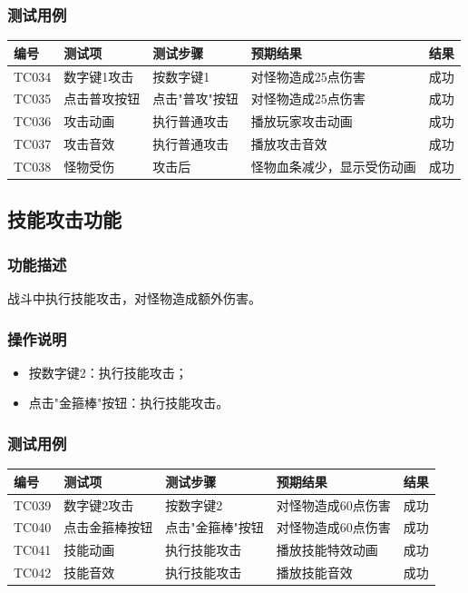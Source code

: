 \documentclass[a4paper,12pt]{article}
\begin{document}
\subsubsection{测试用例}
\begin{longtable}{p{1.2cm} p{2.8cm} p{4cm} p{3.5cm} p{1.5cm}}
\toprule
\textbf{编号} & \textbf{测试项} & \textbf{测试步骤} & \textbf{预期结果} & \textbf{结果} \\
\midrule
\endhead
TC034 & 数字键1攻击 & 按数字键1 & 对怪物造成25点伤害 & 成功 \\
TC035 & 点击普攻按钮 & 点击"普攻"按钮 & 对怪物造成25点伤害 & 成功 \\
TC036 & 攻击动画 & 执行普通攻击 & 播放玩家攻击动画 & 成功 \\
TC037 & 攻击音效 & 执行普通攻击 & 播放攻击音效 & 成功 \\
TC038 & 怪物受伤 & 攻击后 & 怪物血条减少，显示受伤动画 & 成功 \\
\bottomrule
\end{longtable}

\subsection{技能攻击功能}

\subsubsection{功能描述}
战斗中执行技能攻击，对怪物造成额外伤害。

\subsubsection{操作说明}
\begin{itemize}[leftmargin=2em]
    \item 按数字键2：执行技能攻击；
    \item 点击"金箍棒"按钮：执行技能攻击。
\end{itemize}

\subsubsection{测试用例}
\begin{longtable}{p{1.2cm} p{2.8cm} p{4cm} p{3.5cm} p{1.5cm}}
\toprule
\textbf{编号} & \textbf{测试项} & \textbf{测试步骤} & \textbf{预期结果} & \textbf{结果} \\
\midrule
\endhead
TC039 & 数字键2攻击 & 按数字键2 & 对怪物造成60点伤害 & 成功 \\
TC040 & 点击金箍棒按钮 & 点击"金箍棒"按钮 & 对怪物造成60点伤害 & 成功 \\
TC041 & 技能动画 & 执行技能攻击 & 播放技能特效动画 & 成功 \\
TC042 & 技能音效 & 执行技能攻击 & 播放技能音效 & 成功 \\
\bottomrule
\end{longtable}
\end{document}
